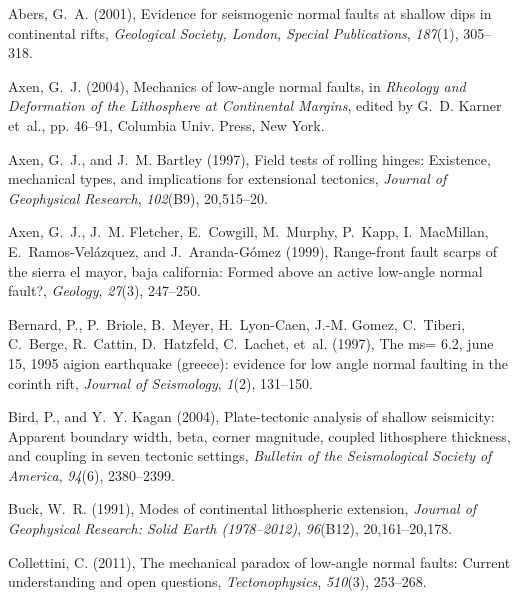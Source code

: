 \documentclass[twocolumn,grl]{AGUTeX}
\begin{document}
\begin{article}
\begin{thebibliography}{29}
Abers, G.~A. (2001), Evidence for seismogenic normal faults at shallow dips in
  continental rifts, \textit{Geological Society, London, Special Publications},
  \textit{187}(1), 305--318.

Axen, G.~J. (2004), Mechanics of low-angle normal faults, in \textit{Rheology
  and Deformation of the Lithosphere at Continental Margins}, edited by G.~D.
  Karner et~al., pp. 46--91, Columbia Univ. Press, New York.

Axen, G.~J., and J.~M. Bartley (1997), Field tests of rolling hinges:
  Existence, mechanical types, and implications for extensional tectonics,
  \textit{Journal of Geophysical Research}, \textit{102}(B9), 20,515--20.

Axen, G.~J., J.~M. Fletcher, E.~Cowgill, M.~Murphy, P.~Kapp, I.~MacMillan,
  E.~Ramos-Vel{\'a}zquez, and J.~Aranda-G{\'o}mez (1999), Range-front fault
  scarps of the sierra el mayor, baja california: Formed above an active
  low-angle normal fault?, \textit{Geology}, \textit{27}(3), 247--250.

Bernard, P., P.~Briole, B.~Meyer, H.~Lyon-Caen, J.-M. Gomez, C.~Tiberi,
  C.~Berge, R.~Cattin, D.~Hatzfeld, C.~Lachet, et~al. (1997), The ms= 6.2, june
  15, 1995 aigion earthquake (greece): evidence for low angle normal faulting
  in the corinth rift, \textit{Journal of Seismology}, \textit{1}(2), 131--150.

Bird, P., and Y.~Y. Kagan (2004), Plate-tectonic analysis of shallow
  seismicity: Apparent boundary width, beta, corner magnitude, coupled
  lithosphere thickness, and coupling in seven tectonic settings,
  \textit{Bulletin of the Seismological Society of America}, \textit{94}(6),
  2380--2399.

Buck, W.~R. (1991), Modes of continental lithospheric extension,
  \textit{Journal of Geophysical Research: Solid Earth (1978--2012)},
  \textit{96}(B12), 20,161--20,178.

Collettini, C. (2011), The mechanical paradox of low-angle normal faults:
  Current understanding and open questions, \textit{Tectonophysics},
  \textit{510}(3), 253--268.


\end{thebibliography}
\end{article}
\end{document}
